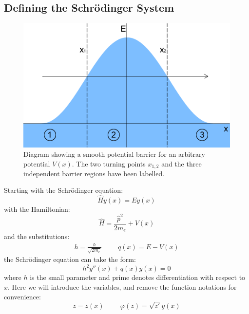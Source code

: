 		\subsection{Defining the Schr{\" o}dinger System}
		\label{Appendix - Defining the Schrodinger System}
		\begin{figure}[h]
			\centerline{\includegraphics[scale=0.6]{images/s-wkb-potential-flat}}
			\caption{Diagram showing a smooth potential barrier for an arbitrary potential $V\left(x\right)$. The two turning points $x_{1,2}$ and the three independent barrier regions have been labelled.}
			\label{s-wkb-potential-flat}
		\end{figure}
		Starting with the Schr{\" o}dinger equation:
		\begin{equation}
			\hat{H}y\left(x\right)=Ey\left(x\right)
		\end{equation}
		with the Hamiltonian:
		\begin{equation}
			\hat{H}=\frac{\hat{p}^2}{2m_{e}}+V\left(x\right)
		\end{equation}
		and the substitutions:
		\begin{align}
			h=\frac{\hbar}{\sqrt{2m_{e}}}
			\hspace{1cm}
			q\left(x\right)=E-V\left(x\right)
		\end{align}
		the Schr{\" o}dinger equation can take the form:
		\begin{equation}
			h^{2}y''\left(x\right)+q\left(x\right)y\left(x\right)=0
		\end{equation}
		where $h$ is the small parameter and prime denotes differentiation with respect to $x$. Here we will introduce the variables, and remove the function notations for convenience:
		\begin{equation}
			z=z\left(x\right)\hspace{1cm}\varphi\left(z\right)=\sqrt{z'}y\left(x\right)
		\end{equation}
